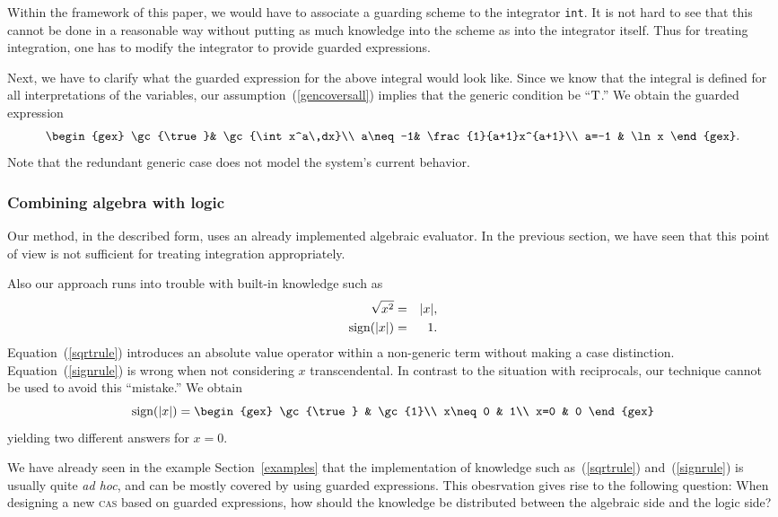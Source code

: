 Within the framework of this paper, we would have to associate a
guarding scheme to the integrator {\tt int}. It is not hard to see
that this cannot be done in a reasonable way without putting as much
knowledge into the scheme as into the integrator itself. Thus for
treating integration, one has to modify the integrator to provide
guarded expressions.

Next, we have to clarify what the guarded expression for the above
integral would look like. Since we know that the integral is defined
for all interpretations of the variables, our
assumption~(\ref{gencoversall}) implies that the generic condition be
``$\textrm{T}$.'' We obtain the guarded expression
$$
\begin{gex}
\gc{\true}& \gc{\int x^a\,dx}\\
a\neq-1& \frac{1}{a+1}x^{a+1}\\
a=-1 & \ln x
\end{gex}.
$$
Note that the redundant generic case does not model the system's
current behavior.
%
\subsubsection{Combining algebra with logic}
Our method, in the described form, uses an already implemented
algebraic evaluator. In the previous section, we have seen that this
point of view is not sufficient for treating integration
appropriately.

Also our approach runs into trouble with built-in knowledge such as
\begin{eqnarray}
\sqrt{x^2}&=&|x|\label{sqrtrule},\\
\textrm{sign}(|x|)&=&1\label{signrule}.
\end{eqnarray}
Equation~(\ref{sqrtrule}) introduces an absolute value operator within
a non-generic term without making a case distinction.
Equation~(\ref{signrule}) is wrong when not considering $x$
transcendental. In contrast to the situation with reciprocals, our
technique cannot be used to avoid this ``mistake.'' We obtain
$$
\sign(|x|)=\begin{gex}
\gc{\true} & \gc{1}\\
x\neq0 & 1\\
x=0 & 0
	   \end{gex}
$$
yielding two different answers for $x=0$.

We have already seen in the example Section~\ref{examples} that the
implementation of knowledge such as~(\ref{sqrtrule})
and~(\ref{signrule}) is usually quite {\it ad hoc}, and can be mostly
covered by using guarded expressions. This obesrvation gives rise to
the following question: When designing a new \textsc{cas} based on guarded
expressions, how should the knowledge be distributed between the
algebraic side and the logic side?
%
